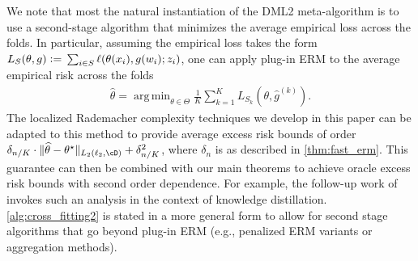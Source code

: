 \documentclass[11pt]{article} %
\newcommand{\pref}[1]{\cref{#1}}
\theoremstyle{theorem}  %
\theoremstyle{plain}
\DeclarePairedDelimiter{\abs}{\lvert}{\rvert} %
\DeclarePairedDelimiter{\crl}{\{}{\}}
\DeclarePairedDelimiter{\nrm}{\|}{\|}
\DeclareMathOperator*{\argmin}{arg\,min} %
\newcommand{\ls}{\ell}
\newcommand{\ldef}{\vcentcolon=}
\newcommand{\wt}[1]{\widetilde{#1}}
\newcommand{\wh}[1]{\widehat{#1}}
\let\wt\undefined
\newcommand{\wt}[1]{\widetilde{#1}}
\newcommand{\grad}{\nabla}
\newcommand{\estone}{\wh{g}}
\newcommand{\esttwo}{\wh{\theta}}
\newcommand{\Aclass}{\cA}
\newcommand{\esta}{\wh{a}}
\newcommand{\nuisance}{\cG}
\newcommand{\besttwo}{\theta^{\star}}
\newcommand{\sampleone}{S_1}
\newcommand{\sampletwo}{S_2}
\newcommand{\samplethree}{S_3}
\newcommand{\samplefour}{S_4}
\newcommand{\ind}[1]{^{\scriptscriptstyle (#1)}}
\begin{document}
We note that most the natural instantiation of the DML2
  meta-algorithm is to use a second-stage algorithm that minimizes the
  average empirical loss across the folds. In particular, assuming the empirical loss takes the form
  $L_{S}(\theta,g)\ldef{}\sum_{i\in{}S}\ls(\theta(x_i),g(w_i); z_i)$,
  one can apply plug-in ERM to the average empirical risk across the folds
\begin{align}
  \esttwo = \argmin_{\theta\in\Theta}\frac{1}{K}\sum_{k=1}^{K}L_{S_k}(\theta, \estone\ind{k}).
\end{align}
The localized Rademacher complexity techniques we develop in this
paper can be adapted to this method to provide average excess risk
bounds of order $\delta_{n/K}\cdot\nrm{\esttwo -
  \besttwo}_{L_2(\ell_2,\cD)}+\delta_{n/K}^2$, where $\delta_n$ is as
described in \pref{thm:fast_erm}. This guarantee can then be combined
with our main theorems to achieve oracle excess risk bounds with
second order dependence. For example, the follow-up work of
\cite{dao2020knowledge} invokes such an analysis in the context of
knowledge distillation. \pref{alg:cross_fitting2} is stated in a more
general form to allow for second stage algorithms that go beyond
plug-in ERM (e.g., penalized ERM variants or aggregation methods).


%
%
%
%
%
%

\end{document}

